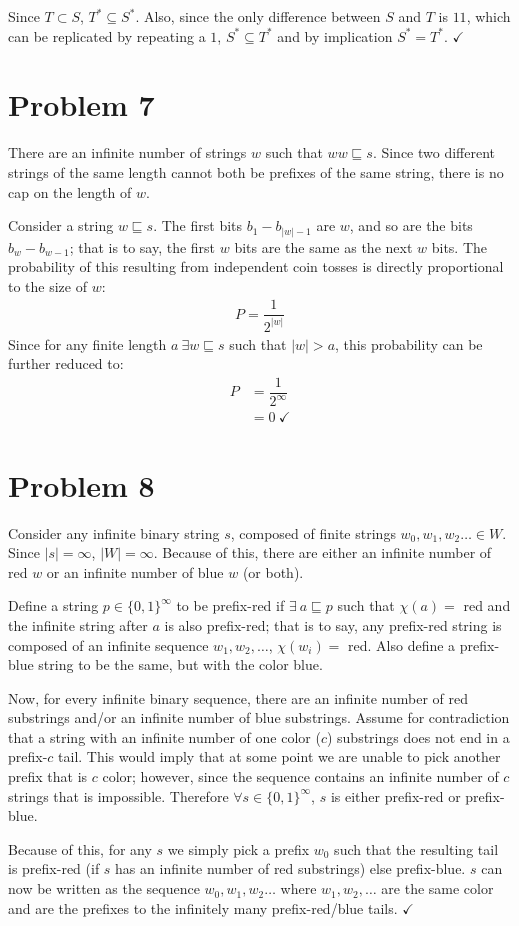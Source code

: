 \documentclass[11pt]{article}
\begin{document}
Since $T \subset S$, $T^* \subseteq S^*$. Also, since the only difference between $S$ and $T$ is $11$, which can be replicated by repeating a $1$, $S^* \subseteq T^*$ and by implication $S^* = T^*$. $\checkmark$

\section*{Problem 7}
There are an infinite number of strings $w$ such that $ww \sqsubseteq s$. Since two different strings of the same length cannot both be prefixes of the same string, there is no cap on the length of $w$.

Consider a string $w \sqsubseteq s$.  The first bits $b_1 - b_{|w| -1}$ are $w$, and so are the bits $b_{w} - b_{w-1}$; that is to say, the first $w$ bits are the same as the next $w$ bits. The probability of this resulting from independent coin tosses is directly proportional to the size of $w$:
	\begin{align*}
	P = \dfrac{1}{2^{|w|}}
	\end{align*}
Since for any finite length $a\ \exists w \sqsubseteq s$ such that $|w| > a$, this probability can be further reduced to:
	\begin{align*}
	P &= \dfrac{1}{2^{\infty}} \\
	&=0\ \checkmark
	\end{align*}
	

\section*{Problem 8}
Consider any infinite binary string $s$, composed of finite strings $w_0, w_1, w_2  \dots \in W$. Since $|s| = \infty$, $|W| = \infty$. Because of this, there are either an infinite number of red $w$ or an infinite number of blue $w$ (or both).

Define a string $p \in \{0,1\}^{\infty}$ to be prefix-red if $\exists \ a \sqsubseteq p $ such that $\chi(a) =$ red and the infinite string after $a$ is also prefix-red; that is to say, any prefix-red string is composed of an infinite sequence $w_1, w_2, \dots$, $\chi(w_i) =$ red. Also define a prefix-blue string to be the same, but with the color blue.

Now, for every infinite binary sequence, there are an infinite number of red substrings and/or an infinite number of blue substrings. Assume for contradiction that a string with an infinite number of one color ($c$) substrings does not end in a prefix-$c$ tail. This would imply that at some point we are unable to pick another prefix that is $c$ color; however, since the sequence contains an infinite number of $c$ strings that is impossible. Therefore $\forall s \in \{0,1\}^{\infty}$, $s$ is either prefix-red or prefix-blue.

Because of this, for any $s$ we simply pick a prefix $w_0$ such that the resulting tail is prefix-red (if $s$ has an infinite number of red substrings) else prefix-blue. $s$ can now be written as the sequence $w_0, w_1, w_2  \dots $ where $w_1, w_2, \dots$ are the same color and are the prefixes to the infinitely many prefix-red/blue tails. $\checkmark$
\end{document}

